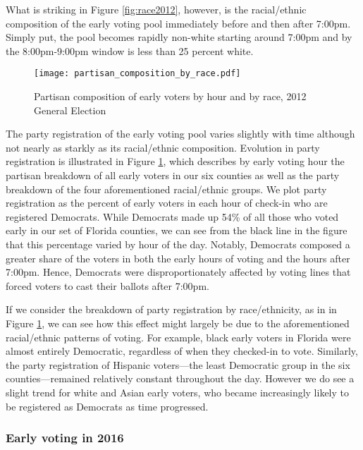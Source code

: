 \documentclass[12pt,titlepage]{article}
\begin{document}
What is striking in Figure \ref{fig:race2012}, however, is the racial/ethnic
composition of the early voting pool immediately before and then after
7:00pm.  Simply put, the pool becomes rapidly non-white starting
around 7:00pm and by the 8:00pm-9:00pm window is less than 25 percent
white.

\begin{figure}[!ht]
\caption{Partisan composition of early voters by hour and by race, 2012
  General Election}
  \label{fig:party2012}
  \centering
    \centering\texttt{[image: partisan\_composition\_by\_race.pdf]}
\end{figure}

The party registration of the early voting pool varies slightly with time
although not nearly as starkly as its racial/ethnic composition.  Evolution
in party registration is illustrated in Figure \ref{fig:party2012}, which
describes by early voting hour the partisan breakdown of all early
voters in our six counties as well as the party breakdown of the
four aforementioned racial/ethnic groups.  We plot party registration as the percent of early voters in
each hour of check-in who are registered Democrats.  While Democrats
made up 54\% of all those who voted early in our set of Florida
counties, we can see from the black line in the figure that this
percentage varied by hour of the day.  Notably, Democrats composed a
greater share of the voters in both the early hours of voting and the
hours after 7:00pm.  Hence, Democrats were disproportionately affected
by voting lines that forced voters to cast their ballots after 7:00pm.


If we consider the breakdown of party registration by race/ethnicity,
as in in Figure \ref{fig:party2012}, we can see how this effect might
largely be due to the aforementioned racial/ethnic patterns of voting.
For example, black early voters in Florida were almost entirely
Democratic, regardless of when they checked-in to vote.  Similarly,
the party registration of Hispanic voters---the least Democratic group
in the six counties---remained relatively constant throughout the day.
However we do see a slight trend for white and Asian early voters, who
became increasingly likely to be registered as Democrats as time
progressed.


\subsubsection*{Early voting in 2016}
\end{document}
